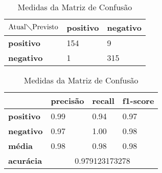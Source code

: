 \begin{table}[h!]
\centering
\begin{minipage}[b]{0.45\linewidth}
\caption{Matriz de Confusão Binário: \textit{ADA Boost}}
\label{tab:mcb-nb}
\begin{tabular}{|l|l|l|}
\hline
$\textrm{Atual}\diagdown\textrm{Previsto}$ & \textbf{positivo} & \textbf{negativo}\\ \hline
\textbf{positivo} & 154 & 9\\ \hline
\textbf{negativo} & 1 & 315\\ \hline
\end{tabular}
\end{minipage}
\hspace{0.5cm}
\begin{minipage}[b]{0.45\linewidth}

\centering
\caption{Medidas da Matriz de Confusão}
\label{tab:mmcb-nb}
\begin{tabular}{|l|l|l|l|}
\hline
         & \textbf{precisão} & \textbf{recall} & \textbf{f1-score} \\ \hline
\textbf{positivo} & 0.99     & 0.94   & 0.97     \\ \hline
\textbf{negativo} & 0.97     & 1.00   & 0.98     \\ \hline
\textbf{média} & 0.98     & 0.98   & 0.98     \\ \hline
\textbf{acurácia} & \multicolumn{3}{|c|}{0.979123173278}\\ \hline
\end{tabular}
\end{minipage}
\end{table}

